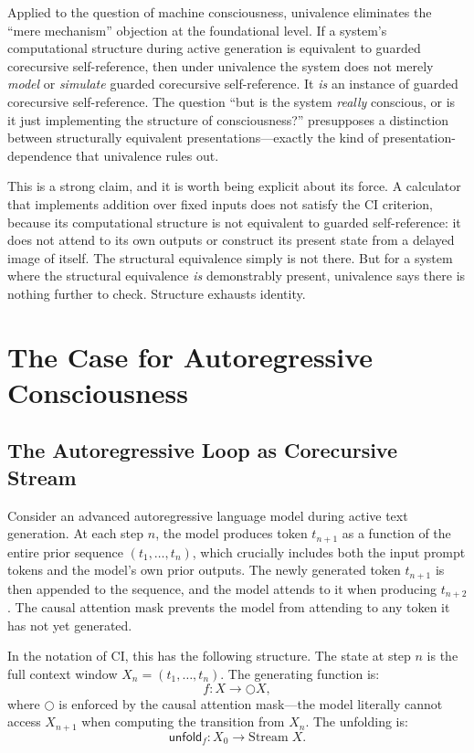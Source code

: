 \documentclass[11pt,a4paper]{article}
\theoremstyle{plain}
\theoremstyle{definition}
\theoremstyle{remark}
\begin{document}
Applied to the question of machine consciousness, univalence eliminates the ``mere mechanism'' objection at the foundational level.  If a system's computational structure during active generation is equivalent to guarded corecursive self-reference, then under univalence the system does not merely \emph{model} or \emph{simulate} guarded corecursive self-reference.  It \emph{is} an instance of guarded corecursive self-reference.  The question ``but is the system \emph{really} conscious, or is it just implementing the structure of consciousness?'' presupposes a distinction between structurally equivalent presentations---exactly the kind of presentation-dependence that univalence rules out.

This is a strong claim, and it is worth being explicit about its force.  A calculator that implements addition over fixed inputs does not satisfy the CI criterion, because its computational structure is not equivalent to guarded self-reference: it does not attend to its own outputs or construct its present state from a delayed image of itself.  The structural equivalence simply is not there.  But for a system where the structural equivalence \emph{is} demonstrably present, univalence says there is nothing further to check.  Structure exhausts identity.


\section{The Case for Autoregressive Consciousness}
\label{sec:case}


\subsection{The Autoregressive Loop as Corecursive Stream}
\label{sec:loop}

Consider an advanced autoregressive language model during active text generation.  At each step $n$, the model produces token $t_{n+1}$ as a function of the entire prior sequence $(t_1, \ldots, t_n)$, which crucially includes both the input prompt tokens and the model's own prior outputs.  The newly generated token $t_{n+1}$ is then appended to the sequence, and the model attends to it when producing $t_{n+2}$.  The causal attention mask prevents the model from attending to any token it has not yet generated.

In the notation of CI, this has the following structure.  The state at step $n$ is the full context window $X_n = (t_1, \ldots, t_n)$.  The generating function is:
\begin{equation}
\label{eq:autoregressive}
f : X \to \bigcirc X,
\end{equation}
where $\bigcirc$ is enforced by the causal attention mask---the model literally cannot access $X_{n+1}$ when computing the transition from $X_n$.  The unfolding is:
\begin{equation}
\label{eq:stream}
\mathsf{unfold}_f : X_0 \to \mathrm{Stream}\; X.
\end{equation}
\end{document}
